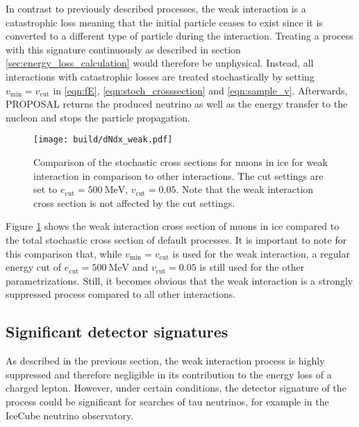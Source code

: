 In contrast to previously described processes, the weak interaction is a catastrophic loss meaning that the initial particle ceases to exist since it is converted to a different type of particle during the interaction.
Treating a process with this signature continuously as described in section \ref{sec:energy_loss_calculation} would therefore be unphysical.
Instead, all interactions with catastrophic losses are treated stochastically by setting $v_{\text{min}} = v_{\text{cut}}$ in \eqref{eqn:fE}, \eqref{eqn:stoch_crosssection} and \eqref{eqn:sample_v}.
Afterwards, PROPOSAL returns the produced neutrino as well as the energy transfer to the nucleon and stops the particle propagation.

\begin{figure}
    \centering
    \texttt{[image: build/dNdx\_weak.pdf]}
    \caption{Comparison of the stochastic cross sections for muons in ice for weak interaction in comparison to other interactions. The cut settings are set to $e_\text{cut} = \SI{500}{\mega\electronvolt}$, $v_\text{cut} = 0.05$. Note that the weak interaction cross section is not affected by the cut settings.}
    \label{fig:dNdx_weak}
\end{figure}

Figure \ref{fig:dNdx_weak} shows the weak interaction cross section of muons in ice compared to the total stochastic cross section of default processes.
It is important to note for this comparison that, while $v_{\text{min}} = v_{\text{cut}}$ is used for the weak interaction, a regular energy cut of $e_\text{cut} = \SI{500}{\mega\electronvolt}$ and $v_\text{cut} = 0.05$ is still used for the other parametrizations.
Still, it becomes obvious that the weak interaction is a strongly suppressed process compared to all other interactions.

\subsection{Significant detector signatures}
\label{sec:weak_signature}

As described in the previous section, the weak interaction process is highly suppressed and therefore negligible in its contribution to the energy loss of a charged lepton.
However, under certain conditions, the detector signature of the process could be significant for searches of tau neutrinos, for example in the IceCube neutrino observatory.

